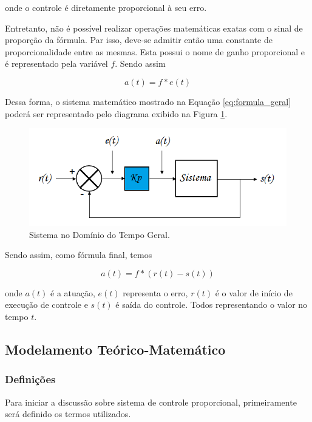 \documentclass[portugues, brazil, a4paper,12pt]{article}
\begin{document}
			onde o controle é diretamente proporcional à seu erro.
			
			Entretanto, não é possível realizar operações matemáticas exatas com o sinal de proporção da fórmula. Par isso, deve-se admitir então uma constante de proporcionalidade entre as mesmas. Esta possui o nome de ganho proporcional e é representado pela variável $f$. Sendo assim
			
			\begin{equation}
				a(t) = f * e(t) \label{eq:formula_geral}
			\end{equation}
			
			Dessa forma, o sistema matemático mostrado na Equação \ref{eq:formula_geral} poderá ser representado pelo diagrama exibido na Figura \ref{fig:sistema_dominio_tempo}.
			
			\begin{figure}[H]
				\centering
				\includegraphics[width=\linewidth]{img/cp-diagrama_geral.png}
				\caption{Sistema no Domínio do Tempo Geral.}
				\label{fig:sistema_dominio_tempo}
			\end{figure}
			
			Sendo assim, como fórmula final, temos
			
			\begin{equation}
				a(t) = f * (r(t) - s(t))
			\end{equation}
			
			onde $a(t)$ é a atuação, $e(t)$ representa o erro, $ r(t) $ é o valor de início de execução de controle e $ s(t) $ é saída do controle. Todos representando o valor no tempo $t$.
	
	\subsection{Modelamento Teórico-Matemático}
		\subsubsection{Definições}
			Para iniciar a discussão sobre sistema de controle proporcional, primeiramente será definido os termos utilizados.
			
\end{document}
